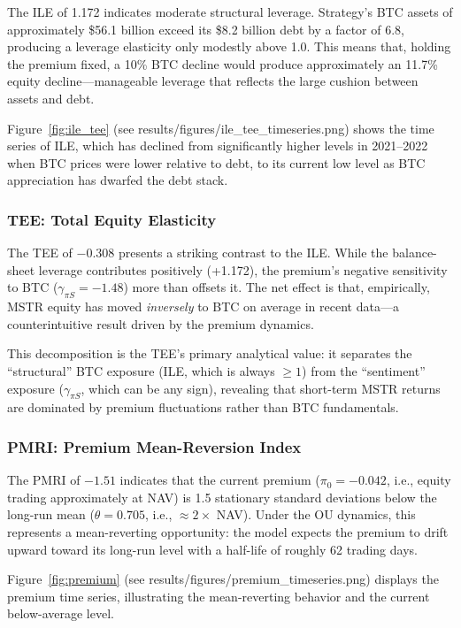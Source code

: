 The ILE of 1.172 indicates moderate structural leverage. Strategy's BTC assets of approximately \$56.1 billion exceed its \$8.2 billion debt by a factor of 6.8, producing a leverage elasticity only modestly above 1.0. This means that, holding the premium fixed, a 10\% BTC decline would produce approximately an 11.7\% equity decline---manageable leverage that reflects the large cushion between assets and debt.

Figure~\ref{fig:ile_tee} (see results/figures/ile\_tee\_timeseries.png) shows the time series of ILE, which has declined from significantly higher levels in 2021--2022 when BTC prices were lower relative to debt, to its current low level as BTC appreciation has dwarfed the debt stack.

\subsubsection{TEE: Total Equity Elasticity}

The TEE of $-0.308$ presents a striking contrast to the ILE. While the balance-sheet leverage contributes positively (+1.172), the premium's negative sensitivity to BTC ($\gamma_{\pi S} = -1.48$) more than offsets it. The net effect is that, empirically, MSTR equity has moved \emph{inversely} to BTC on average in recent data---a counterintuitive result driven by the premium dynamics.

This decomposition is the TEE's primary analytical value: it separates the ``structural'' BTC exposure (ILE, which is always $\ge 1$) from the ``sentiment'' exposure ($\gamma_{\pi S}$, which can be any sign), revealing that short-term MSTR returns are dominated by premium fluctuations rather than BTC fundamentals.

\subsubsection{PMRI: Premium Mean-Reversion Index}

The PMRI of $-1.51$ indicates that the current premium ($\pi_0 = -0.042$, i.e., equity trading approximately at NAV) is 1.5 stationary standard deviations below the long-run mean ($\theta = 0.705$, i.e., $\approx 2\times$ NAV). Under the OU dynamics, this represents a mean-reverting opportunity: the model expects the premium to drift upward toward its long-run level with a half-life of roughly 62 trading days.

Figure~\ref{fig:premium} (see results/figures/premium\_timeseries.png) displays the premium time series, illustrating the mean-reverting behavior and the current below-average level.

